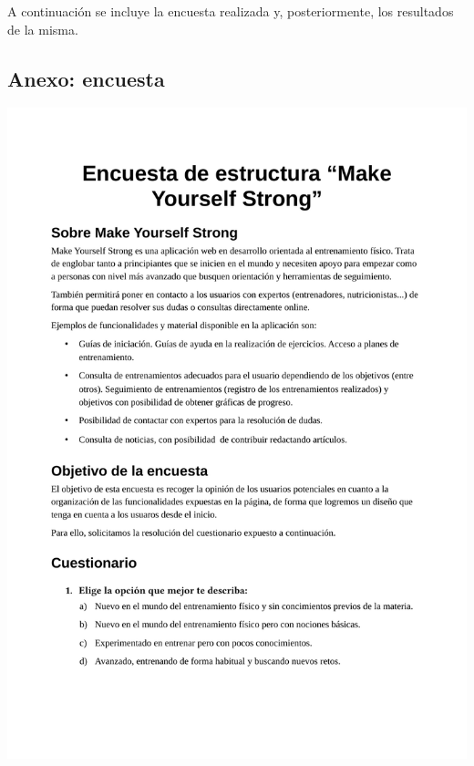 \documentclass[a4paper]{article}
\begin{document}
 A continuación se incluye la encuesta realizada y, posteriormente, los resultados de la misma.
 
 \subsection{Anexo: encuesta}
 
 \includegraphics[width=\textwidth, page=1]{./figuras/encuesta.pdf}
\end{document}

